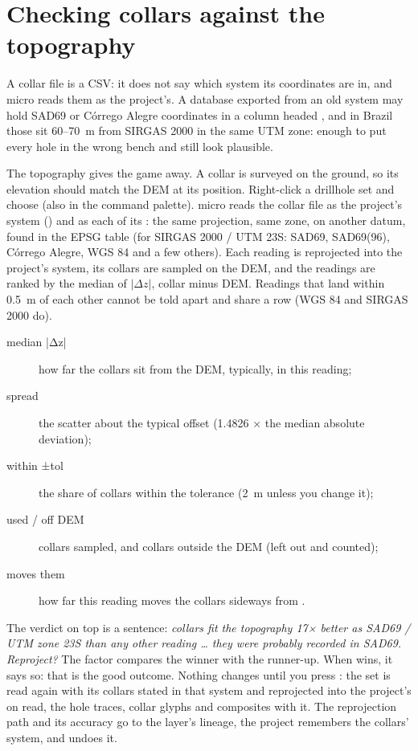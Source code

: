 \section{Checking collars against the topography}\label{sec:crs-detective}

A collar file is a CSV: it does not say which system its coordinates are in, and micro reads them as
the project's. A database exported from an old system may hold SAD69 or Córrego Alegre coordinates in
a column headed , and in Brazil those sit 60–70~m from SIRGAS 2000 in the same UTM zone: enough
to put every hole in the wrong bench and still look plausible.

The topography gives the game away. A collar is surveyed on the ground, so its elevation should match
the DEM at its position. Right-click a drillhole set and choose  (also in the command palette). micro reads the collar file as the project's system
() and as each of its : the same projection, same zone, on another datum,
found in the EPSG table (for SIRGAS 2000 / UTM 23S: SAD69, SAD69(96), Córrego Alegre, WGS 84 and a few
others). Each reading is reprojected into the project's system, its collars are sampled on the DEM, and
the readings are ranked by the median of $|\Delta z|$, collar minus DEM. Readings that land within
0.5~m of each other cannot be told apart and share a row (WGS 84 and SIRGAS 2000 do).

\begin{description}
\item[median |Δz|] how far the collars sit from the DEM, typically, in this reading;
\item[spread] the scatter about the typical offset (1.4826 × the median absolute deviation);
\item[within ±tol] the share of collars within the tolerance (2~m unless you change it);
\item[used / off DEM] collars sampled, and collars outside the DEM (left out and counted);
\item[moves them] how far this reading moves the collars sideways from .
\end{description}

The verdict on top is a sentence: \emph{collars fit the topography 17× better as SAD69 / UTM zone 23S
than any other reading … they were probably recorded in SAD69. Reproject?} The factor compares the
winner with the runner-up. When  wins, it says so: that is the good outcome. Nothing changes
until you press : the set is read again with its collars stated in that
system and reprojected into the project's on read, the hole traces, collar glyphs and composites with
it. The reprojection path and its accuracy go to the layer's lineage, the project remembers the
collars' system, and  undoes it.

